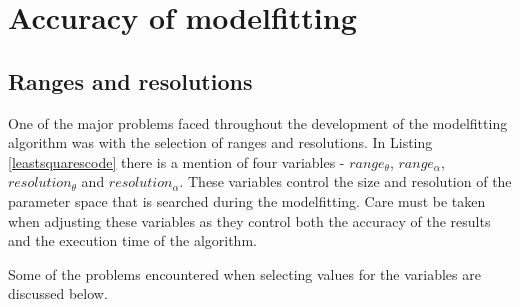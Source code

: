 \newcommand{\graphwidth}{5.8cm}


\section{Accuracy of modelfitting}

\subsection{Ranges and resolutions}

One of the major problems faced throughout the development of the modelfitting algorithm was with the selection of ranges and resolutions.
In Listing \ref{leastsquarescode} there is a mention of four variables - $range_\theta$, $range_\alpha$, $resolution_\theta$ and $resolution_\alpha$.
These variables control the size and resolution of the parameter space that is searched during the modelfitting.
Care must be taken when adjusting these variables as they control both the accuracy of the results and the execution time of the algorithm.

Some of the problems encountered when selecting values for the variables are discussed below.

